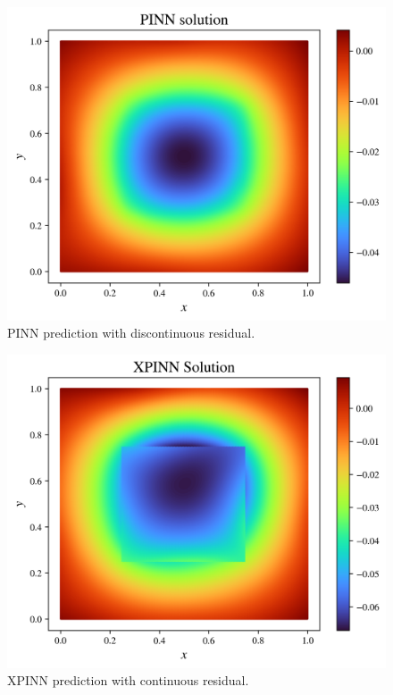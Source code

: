 \begin{figure}[h]
    \centering
    \includegraphics[width=\linewidth]{Project1XPINNs/figures/Poisson/discrete_single_Poisson_solution.pdf.png}
    \caption{PINN prediction with discontinuous residual.}
    \label{fig:pinn_disc_pred}
\end{figure}

\begin{figure}[h]
    \centering
    \includegraphics[width=\linewidth]{Project1XPINNs/figures/Poisson/discrete_xpinn_Poisson_solution.png}
    \caption{XPINN prediction with continuous residual.}
    \label{fig:xpinn_disc_pred}
\end{figure}

